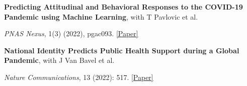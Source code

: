 \documentclass[letterpaper]{article}
\renewenvironment{itemize}{
  \begin{list}{}{
    \setlength{\leftmargin}{1.5em}
  }
}{
  \end{list}
}
\begin{document}
\medskip


\begin{itemize}
	\item \textbf{Predicting Attitudinal and Behavioral Responses to the COVID-19 Pandemic using Machine Learning}, with T Pavlovic et al. 
		\vspace{-0.05in}
\item \textit{PNAS Nexus}, 1(3) (2022), pgac093.   \href{https://doi.org/10.1093/pnasnexus/pgac093}{[Paper]}
\end{itemize}


		\medskip


\begin{itemize}
	\item \textbf{National Identity Predicts Public Health Support during a Global Pandemic}, with J Van Bavel et al. 
		\vspace{-0.05in}
\item \textit{Nature Communications}, 13 (2022): 517. \href{https://www.nature.com/articles/s41467-021-27668-9}{[Paper]}
\end{itemize}

\medskip
\end{document}
